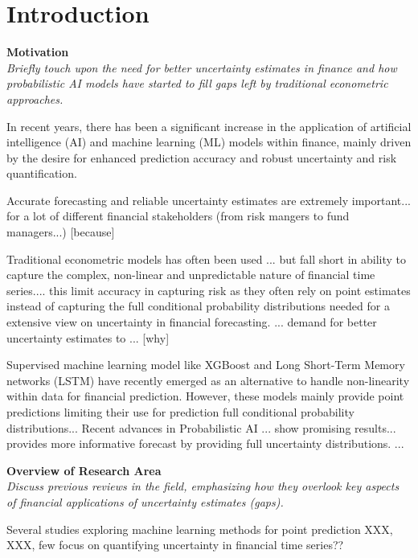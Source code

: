 \section{Introduction}
\label{sec:introduction}

\textbf{Motivation}\\
\textit{Briefly touch upon the need for better uncertainty estimates in finance and how probabilistic AI models have started to fill gaps left by traditional econometric approaches.}

In recent years, there has been a significant increase in the application of artificial intelligence (AI) and machine learning (ML) models within finance, mainly driven by the desire for enhanced prediction accuracy and robust uncertainty and risk quantification. 

Accurate forecasting and reliable uncertainty estimates are extremely important... for a lot of different financial stakeholders (from risk mangers to fund managers...) [because]

Traditional econometric models has often been used ... but fall short in ability to capture the complex, non-linear and unpredictable nature of financial time series.... this limit accuracy in capturing risk as they often rely on point estimates instead of capturing the full conditional probability distributions needed for a extensive view on uncertainty in financial forecasting. ... demand for better uncertainty estimates to ... [why]

Supervised machine learning model like XGBoost and Long Short-Term Memory networks (LSTM)  have recently emerged as an alternative to handle non-linearity within data for financial prediction. However, these models mainly provide point predictions limiting their use for prediction full conditional probability distributions... Recent advances in Probabilistic AI ... show promising results... provides more informative forecast by providing full uncertainty distributions. ...




\textbf{Overview of Research Area}\\
\textit{Discuss previous reviews in the field, emphasizing how they overlook key aspects of financial applications of uncertainty estimates (gaps). }

Several studies exploring machine learning methods for point prediction XXX, XXX, few focus on quantifying uncertainty in financial time series??

